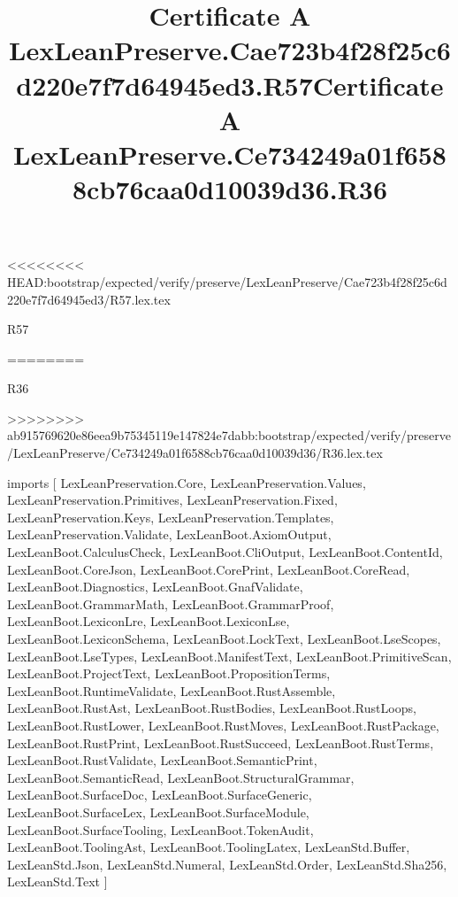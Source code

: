 <<<<<<<< HEAD:bootstrap/expected/verify/preserve/LexLeanPreserve/Cae723b4f28f25c6d220e7f7d64945ed3/R57.lex.tex
\begin{lexlean}{R57}
\title{Certificate A LexLeanPreserve.Cae723b4f28f25c6d220e7f7d64945ed3.R57}
========
\begin{lexlean}{R36}
\title{Certificate A LexLeanPreserve.Ce734249a01f6588cb76caa0d10039d36.R36}
>>>>>>>> ab915769620e86eea9b75345119e147824e7dabb:bootstrap/expected/verify/preserve/LexLeanPreserve/Ce734249a01f6588cb76caa0d10039d36/R36.lex.tex
\begin{coremodule}
imports [
  LexLeanPreservation.Core,
  LexLeanPreservation.Values,
  LexLeanPreservation.Primitives,
  LexLeanPreservation.Fixed,
  LexLeanPreservation.Keys,
  LexLeanPreservation.Templates,
  LexLeanPreservation.Validate,
  LexLeanBoot.AxiomOutput,
  LexLeanBoot.CalculusCheck,
  LexLeanBoot.CliOutput,
  LexLeanBoot.ContentId,
  LexLeanBoot.CoreJson,
  LexLeanBoot.CorePrint,
  LexLeanBoot.CoreRead,
  LexLeanBoot.Diagnostics,
  LexLeanBoot.GnafValidate,
  LexLeanBoot.GrammarMath,
  LexLeanBoot.GrammarProof,
  LexLeanBoot.LexiconLre,
  LexLeanBoot.LexiconLse,
  LexLeanBoot.LexiconSchema,
  LexLeanBoot.LockText,
  LexLeanBoot.LseScopes,
  LexLeanBoot.LseTypes,
  LexLeanBoot.ManifestText,
  LexLeanBoot.PrimitiveScan,
  LexLeanBoot.ProjectText,
  LexLeanBoot.PropositionTerms,
  LexLeanBoot.RuntimeValidate,
  LexLeanBoot.RustAssemble,
  LexLeanBoot.RustAst,
  LexLeanBoot.RustBodies,
  LexLeanBoot.RustLoops,
  LexLeanBoot.RustLower,
  LexLeanBoot.RustMoves,
  LexLeanBoot.RustPackage,
  LexLeanBoot.RustPrint,
  LexLeanBoot.RustSucceed,
  LexLeanBoot.RustTerms,
  LexLeanBoot.RustValidate,
  LexLeanBoot.SemanticPrint,
  LexLeanBoot.SemanticRead,
  LexLeanBoot.StructuralGrammar,
  LexLeanBoot.SurfaceDoc,
  LexLeanBoot.SurfaceGeneric,
  LexLeanBoot.SurfaceLex,
  LexLeanBoot.SurfaceModule,
  LexLeanBoot.SurfaceTooling,
  LexLeanBoot.TokenAudit,
  LexLeanBoot.ToolingAst,
  LexLeanBoot.ToolingLatex,
  LexLeanStd.Buffer,
  LexLeanStd.Json,
  LexLeanStd.Numeral,
  LexLeanStd.Order,
  LexLeanStd.Sha256,
  LexLeanStd.Text
]


\end{coremodule}
\end{lexlean}
\end{lexlean}
